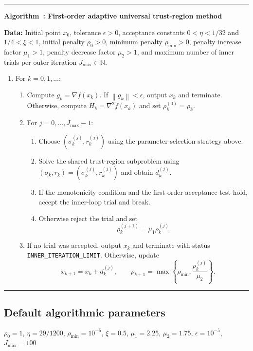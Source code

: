 \documentclass[11pt]{article}
\newcounter{algorithm}
\newcommand{\norm}[1]{\left\lVert #1\right\rVert}
\newcommand{\grad}{\nabla}
\newcommand{\hess}{\nabla^2}
\begin{document}
\begin{center}
\begin{minipage}{0.96\linewidth}
\hrule
\vspace{0.4em}
\label{alg:paper-adaptive-utr}
\noindent\textbf{Algorithm~\thealgorithm: First-order adaptive universal trust-region method}

\smallskip
\noindent\textbf{Data:} Initial point $x_0$, tolerance $\epsilon>0$,
acceptance constants $0<\eta<1/32$ and $1/4<\xi<1$, initial penalty
$\rho_0>0$, minimum penalty $\rho_{\min}>0$, penalty increase factor
$\mu_1>1$, penalty decrease factor $\mu_2>1$, and maximum number of inner
trials per outer iteration $J_{\max}\in\mathbb{N}$.

\begin{enumerate}[leftmargin=2.2em,label=\arabic*.]
    \item For $k=0,1,\ldots$:
    \begin{enumerate}[leftmargin=2.4em,label*=\arabic*.]
        \item Compute $g_k=\grad f(x_k)$.  If
        $\norm{g_k}<\epsilon$, output $x_k$ and terminate.  Otherwise, compute
        $H_k=\hess f(x_k)$ and set $\rho_k^{(0)}=\rho_k$.

        \item For $j=0,\ldots,J_{\max}-1$:
        \begin{enumerate}[leftmargin=2.4em,label*=\arabic*.]
            \item Choose $(\sigma_k^{(j)},r_k^{(j)})$ using the
            parameter-selection strategy above.

            \item Solve the shared trust-region subproblem
            using $(\sigma_k,r_k)=(\sigma_k^{(j)},r_k^{(j)})$ and obtain
            $d_k^{(j)}$.

            \item If the monotonicity condition and the first-order acceptance
            test hold, accept the inner-loop trial and break.

            \item Otherwise reject the trial and set
            \[
                \rho_k^{(j+1)}=\mu_1\rho_k^{(j)}.
            \]
        \end{enumerate}

        \item If no trial was accepted, output $x_k$ and terminate with status
        \texttt{INNER\_ITERATION\_LIMIT}. Otherwise, update
        \[
            x_{k+1}=x_k+d_k^{(j)},
            \qquad
            \rho_{k+1}
            =
            \max\left\{\rho_{\min},\frac{\rho_k^{(j)}}{\mu_2}\right\}.
        \]
    \end{enumerate}
\end{enumerate}
\vspace{0.1em}
\hrule
\end{minipage}
\end{center}

\subsection{Default algorithmic parameters}

$\rho_0 = 1$, $\eta = 29/1200$, $\rho_{\min} = 10^{-5}$, $\xi = 0.5$, $\mu_1 = 2.25$, $\mu_2 = 1.75$, $\epsilon = 10^{-5}$, $J_{\max}=100$
\end{document}
